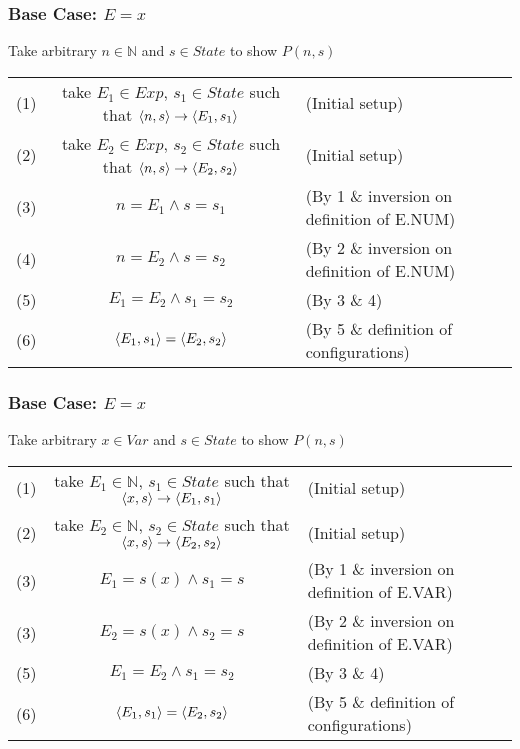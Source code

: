 \documentclass{report}
\begin{document}
            \subsubsection*{Base Case: $E = x$}
                Take arbitrary $n \in \mathbb{N}$ and $s \in State$ to show $P(n,s)$
                \begin{center}
                    \begin{tabular}{r c l}
                        (1) & take $E_1 \in Exp$, $s_1 \in State$ such that $\langle n, s \rangle \to \langle E_1, s_1 \rangle$ & (Initial setup) \\
                        (2) & take $E_2 \in Exp$, $s_2 \in State$ such that $\langle n, s \rangle \to \langle E_2, s_2 \rangle$ & (Initial setup) \\
                        (3) & $n = E_1 \land s = s_1$ & (By 1 \& inversion on definition of E.NUM) \\
                        (4) & $n = E_2 \land s = s_2$ & (By 2 \& inversion on definition of E.NUM) \\
                        (5) & $E_1 = E_2 \land s_1 = s_2$ & (By 3 \& 4) \\
                        (6) & $\langle E_1, s_1 \rangle = \langle E_2, s_2 \rangle$ & (By 5 \& definition of configurations) \\
                    \end{tabular}
                \end{center}
            \subsubsection*{Base Case: $E = x$}
                Take arbitrary $x \in Var$ and $s \in State$ to show $P(n,s)$
                \begin{center}
                    \begin{tabular}{r c l}
                        (1) & take $E_1 \in \mathbb{N}$, $s_1 \in State$ such that $\langle x, s \rangle \to \langle E_1, s_1 \rangle$ & (Initial setup) \\
                        (2) & take $E_2 \in \mathbb{N}$, $s_2 \in State$ such that $\langle x, s \rangle \to \langle E_2, s_2 \rangle$ & (Initial setup) \\
                        (3) & $E_1 = s(x) \land s_1 = s$ & (By 1 \& inversion on definition of E.VAR) \\
                        (3) & $E_2 = s(x) \land s_2 = s$ & (By 2 \& inversion on definition of E.VAR) \\
                        (5) & $E_1 = E_2 \land s_1 = s_2$ & (By 3 \& 4) \\
                        (6) & $\langle E_1, s_1 \rangle = \langle E_2, s_2 \rangle$ & (By 5 \& definition of configurations) \\
                    \end{tabular}
                \end{center}
\end{document}
